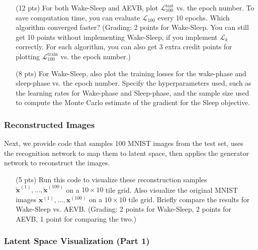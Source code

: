 \begin{itemize}
    \item[(12 pts)] For both Wake-Sleep and AEVB, plot $\mathcal{L}_{100}^\text{test}$ vs. the epoch number. To save computation time, you can evaluate $\mathcal{L}_{100}$ every 10 epochs. Which algorithm converged faster? (Grading: 2 points for Wake-Sleep. You can still get 10 points without implementing Wake-Sleep, if you implement $\mathcal{L}_k$ correctly. For each algorithm, you can also get 3 extra credit points for plotting $\mathcal{L}_{100}^\text{train}$ vs. the epoch number.)
    \begin{solution}
    \end{solution}

    \item[(8 pts)] For Wake-Sleep, also plot the training losses for the wake-phase and sleep-phase vs. the epoch number. Specify the hyperparameters used, such as the learning rates for Wake-phase and Sleep-phase, and the sample size used to compute the Monte Carlo estimate of the gradient for the Sleep objective.
    \begin{solution}
    \end{solution}
\end{itemize}

\subsubsection{Reconstructed Images}

Next, we provide code that samples 100 MNIST images from the test set, uses the recognition network to map them to latent space, then applies the generator network to reconstruct the images.

\begin{itemize}
    \item[(5 pts)] Run this code to visualize these reconstruction samples $\tilde{\mathbf{x}}^{(1)}, \ldots, \tilde{\mathbf{x}}^{(100)}$ on a $10 \times 10$ tile grid. Also visualize the original MNIST images $\mathbf{x}^{(1)}, \ldots, \mathbf{x}^{(100)}$ on a $10 \times 10$ tile grid. Briefly compare the results for Wake-Sleep vs. AEVB. (Grading: 2 points for Wake-Sleep, 2 points for AEVB, 1 point for comparing the two.)
\end{itemize}

\begin{solution}  
\end{solution}

\subsubsection{Latent Space Visualization (Part 1)}

